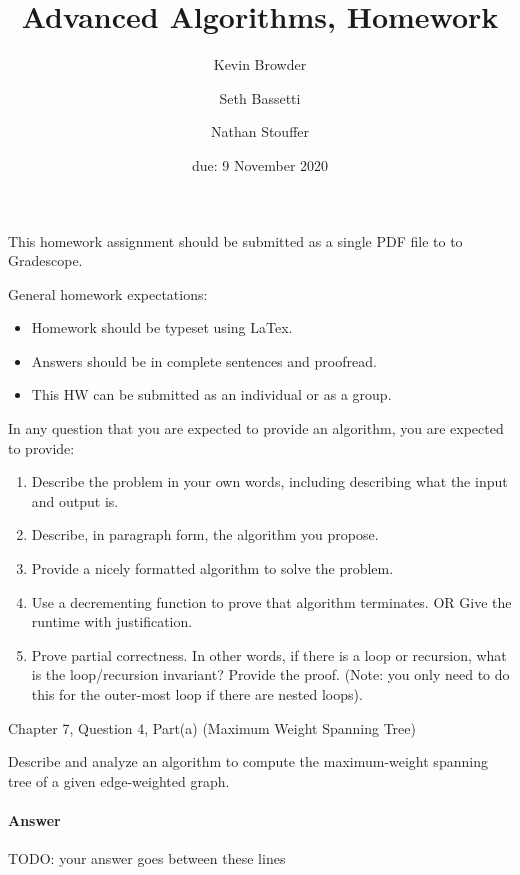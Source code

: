 \documentclass{article}
\title{Advanced Algorithms, Homework \hwnum}
\author{Kevin Browder \and Seth Bassetti \and Nathan Stouffer}
\date{due: 9 November 2020}
\begin{document}
\maketitle

This homework assignment should be submitted as a single PDF file to to Gradescope.

General homework expectations:
\begin{itemize}
    \item Homework should be typeset using LaTex.
    \item Answers should be in complete sentences and proofread.
    \item This HW can be submitted as an individual or as a group.
\end{itemize}

In any question that you are expected to provide an algorithm, you are expected to provide:
\begin{enumerate}
    \item Describe the problem in your own words, including describing what the input and output is.
    \item Describe, in paragraph form, the algorithm you propose.
    \item Provide a nicely formatted algorithm to solve the problem.
    \item Use a decrementing function to prove that algorithm terminates. OR  Give the runtime with justification.
    \item Prove partial correctness.
    In other words, if there is a loop or recursion, what is the loop/recursion invariant?
    Provide the proof.
    (Note: you only need to do this for the outer-most loop if there are nested loops).
\end{enumerate}

\nextprob
{}

Chapter 7, Question 4, Part(a) (Maximum Weight Spanning Tree)

Describe and analyze an algorithm to compute the maximum-weight spanning tree of a given edge-weighted graph.

\paragraph{Answer}


TODO: your answer goes between these lines
\end{document}
